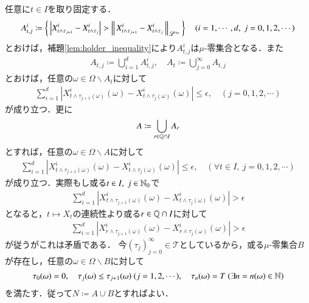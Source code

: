 	\begin{prf}
		任意に$t \in I$を取り固定する．
		\begin{align}
			A_{t,j}^i \coloneqq 
			\left\{\, \left| X_{t \wedge \tau_{j+1}}^i - X_{t \wedge \tau_j}^i \right| > \left\|\, X_{t \wedge \tau_{j+1}}^i - X_{t \wedge \tau_j}^i\, \right\|_{\mathscr{L}^\infty}\, \right\}
			\quad (i=1,\cdots,d,\ j=0,1,2,\cdots)
		\end{align}
		とおけば，補題\ref{lem:holder_inequality}により$A_{t,j}^i$は$\mu$-零集合となる．また
		\begin{align}
			A_{t,j} \coloneqq \bigcup_{i=1}^{d} A_{t,j}^i, \quad
			A_t \coloneqq \bigcup_{j=0}^{\infty} A_{t,j}
		\end{align}
		とおけば，任意の$\omega \in \Omega \backslash A_t$に対して
		\begin{align}
			\sum_{i=1}^{d}\left| X_{t \wedge \tau_{j+1}(\omega)}^i(\omega) - X_{t \wedge \tau_j(\omega)}^i(\omega) \right| \leq \epsilon,
			\quad (j=0,1,2,\cdots)
		\end{align}
		が成り立つ．更に
		\begin{align}
			A \coloneqq \bigcup_{r \in \mathbb{Q} \cap I} A_r
		\end{align}
		とすれば，任意の$\omega \in \Omega \backslash A$に対して
		\begin{align}
			\sum_{i=1}^{d}\left| X_{t \wedge \tau_{j+1}(\omega)}^i(\omega) - X_{t \wedge \tau_j(\omega)}^i(\omega) \right| \leq \epsilon,
			\quad (\forall t \in I,\ j=0,1,2,\cdots)
		\end{align}
		が成り立つ．実際もし或る$t \in I,\ j \in \mathbb{N}_0$で
		\begin{align}
			\sum_{i=1}^{d}\left| X_{t \wedge \tau_{j+1}(\omega)}^i(\omega) - X_{t \wedge \tau_j(\omega)}^i(\omega) \right| > \epsilon
		\end{align}
		となると，$t \longmapsto X_t$の連続性より或る$r \in \mathbb{Q} \cap I$に対して
		\begin{align}
			\sum_{i=1}^{d}\left| X_{r \wedge \tau_{j+1}(\omega)}^i(\omega) - X_{r \wedge \tau_j(\omega)}^i(\omega) \right| > \epsilon
		\end{align}
		が従うがこれは矛盾である．
		今$(\tau_j)_{j=0}^{\infty} \in \mathcal{T}$としているから，或る$\mu$-零集合$B$が存在し，任意の$\omega \in \Omega \backslash B$に対して
		\begin{align}
			\tau_0(\omega) = 0,\quad \tau_j(\omega) \leq \tau_{j+1}(\omega)\ (j=1,2,\cdots),\quad
			\tau_n(\omega) = T\ (\exists n = n(\omega) \in \mathbb{N})
		\end{align}
		を満たす．従って$N \coloneqq A \cup B$とすればよい．
		\QED
	\end{prf}
	
	